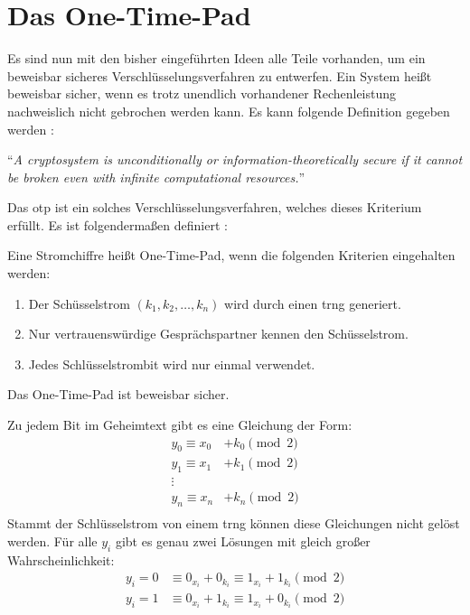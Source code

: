 \section{Das One-Time-Pad}
Es sind nun mit den bisher eingeführten Ideen alle Teile vorhanden, um ein beweisbar
sicheres Verschlüsselungsverfahren zu entwerfen. Ein System heißt beweisbar sicher,
wenn es trotz unendlich vorhandener Rechenleistung nachweislich nicht gebrochen werden kann.
Es kann folgende Definition gegeben werden \parencite[36]{BOOK:crypto}:

\begin{definition}
  \enquote{\textit{A cryptosystem is unconditionally or in\-formation-theoretically
      secure if it cannot be broken even with infinite computational resources.}}
\end{definition}

\noindent
Das \ac{otp} ist ein solches Verschlüsselungsverfahren, welches dieses Kriterium
erfüllt. Es ist folgendermaßen definiert \parencite[37]{BOOK:crypto}:

\begin{definition}
  Eine Stromchiffre heißt One-Time-Pad, wenn die folgenden Kriterien eingehalten werden:
  \begin{enumerate}
    \item Der Schüsselstrom $(k_1,k_2,\dots,k_n)$ wird durch einen \ac{trng} generiert.
    \item Nur vertrauenswürdige Gesprächspartner kennen den Schüsselstrom.
    \item Jedes Schlüsselstrombit wird nur einmal verwendet.
  \end{enumerate}
  Das One-Time-Pad ist beweisbar sicher.
\end{definition}
\noindent
Zu jedem Bit im Geheimtext gibt es eine Gleichung der Form:
\begin{align*}
  y_0   \equiv x_0 & + k_0 \pmod{2} \\
  y_1   \equiv x_1 & + k_1 \pmod{2} \\
  \vdots           &                \\
  y_n   \equiv x_n & + k_n \pmod{2} \\
\end{align*}
\noindent
Stammt der Schlüsselstrom von einem \ac{trng} können diese Gleichungen nicht gelöst werden.
Für alle $y_i$ gibt es genau zwei Lösungen mit gleich großer Wahrscheinlichkeit:
\begin{align*}
  y_i = 0 & \equiv 0_{x_i} + 0_{k_i} \equiv 1_{x_i} + 1_{k_i} \pmod{2} \\
  y_i = 1 & \equiv 0_{x_i} + 1_{k_i} \equiv 1_{x_i} + 0_{k_i} \pmod{2}
\end{align*}

